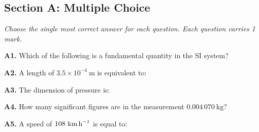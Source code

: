 \newpage

\begin{exercisebox}[1]

\subsection*{Section A: Multiple Choice}

\textit{Choose the single most correct answer for each
question. Each question carries 1 mark.}

\vspace{0.3cm}

\textbf{A1.} Which of the following is a fundamental quantity in
the SI system?


\vspace{0.4cm}

\textbf{A2.} A length of $3.5 \times 10^{-4}\ \text{m}$
is equivalent to:


\vspace{0.4cm}

\textbf{A3.} The dimension of pressure is:


\vspace{0.4cm}

\textbf{A4.} How many significant figures are in the
measurement $0.004\,070\ \text{kg}$?


\vspace{0.4cm}

\textbf{A5.} A speed of $108\ \text{km\,h}^{-1}$ is
equal to:


\vspace{0.4cm}


\end{exercisebox}
